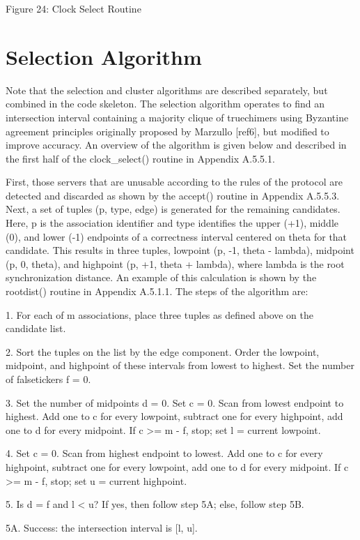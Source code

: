                   Figure 24: Clock Select Routine

\section{Selection Algorithm}

Note that the selection and cluster algorithms are described
separately, but combined in the code skeleton.  The selection
algorithm operates to find an intersection interval containing a
majority clique of truechimers using Byzantine agreement principles
originally proposed by Marzullo [ref6], but modified to improve
accuracy.  An overview of the algorithm is given below and described
in the first half of the clock\_select() routine in Appendix A.5.5.1.

First, those servers that are unusable according to the rules of the
protocol are detected and discarded as shown by the accept() routine
in Appendix A.5.5.3.  Next, a set of tuples (p, type, edge) is
generated for the remaining candidates.  Here, p is the association
identifier and type identifies the upper (+1), middle (0), and lower
(-1) endpoints of a correctness interval centered on theta for that
candidate.  This results in three tuples, lowpoint (p, -1, theta -
lambda), midpoint (p, 0, theta), and highpoint (p, +1, theta +
lambda), where lambda is the root synchronization distance.  An
example of this calculation is shown by the rootdist() routine in
Appendix A.5.1.1.  The steps of the algorithm are:

1.  For each of m associations, place three tuples as defined above
on the candidate list.

2.  Sort the tuples on the list by the edge component.  Order the
lowpoint, midpoint, and highpoint of these intervals from lowest to
highest.  Set the number of falsetickers f = 0.

3.  Set the number of midpoints d = 0.  Set c = 0.  Scan from lowest
endpoint to highest.  Add one to c for every lowpoint, subtract one
for every highpoint, add one to d for every midpoint.  If c >= m - f,
stop; set l = current lowpoint.

4.  Set c = 0.  Scan from highest endpoint to lowest.  Add one to c
for every highpoint, subtract one for every lowpoint, add one to d
for every midpoint.  If c >= m - f, stop; set u = current highpoint.

5.  Is d = f and l < u?  If yes, then follow step 5A; else, follow
step 5B.

5A. Success: the intersection interval is [l, u].

